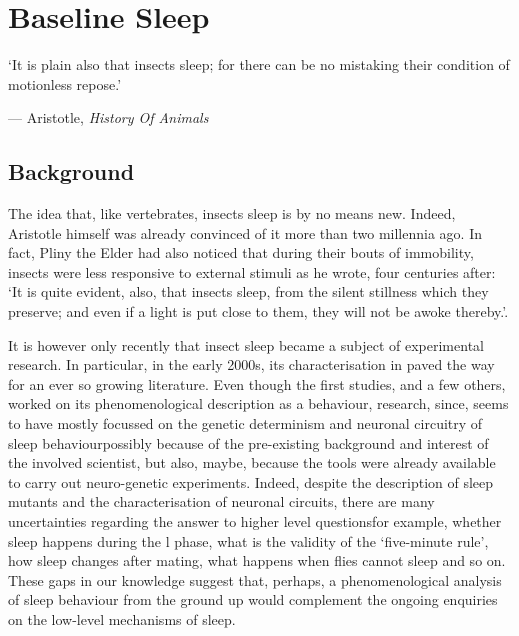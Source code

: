 \edef\figdir{\currfiledir/fig}

\chapter{Baseline Sleep} \label{baseline}

\epigraph{
	`It is plain also that insects sleep; for there can be no mistaking their condition of motionless repose.'}{--- Aristotle, \emph{History Of Animals}~\cite[book~IV, chap.~10]{aristotle_history_1965}}

\section{Background}


The idea that, like vertebrates, insects sleep is by no means new.
Indeed, Aristotle himself was already convinced of it more than two millennia ago. 
In fact, Pliny the Elder had also noticed that during their bouts of immobility, insects were less responsive to external stimuli as he wrote, four centuries after:
`It is quite evident, also, that insects sleep, from the silent stillness which they preserve; and even if a light is put close
to them, they will not be awoke thereby.'\cite[book~X, chap.~97]{pliny_the_elder_natural_1855}.

It is however only recently that insect sleep became a subject of experimental research. 
In particular, in the early 2000s, its characterisation in \droso{} paved the way for an ever so growing literature.
Even though the first studies, and a few others, worked on its phenomenological description as a behaviour, research, since, seems to have mostly focussed on the genetic determinism and neuronal circuitry of sleep behaviour\emd{}possibly because of the pre-existing background and interest of the involved scientist, but also, maybe, because the tools were already available to carry out neuro-genetic experiments.
Indeed, despite the description of sleep mutants and the characterisation of neuronal circuits, 
there are many uncertainties regarding the answer to higher level questions\emd{}for example, whether sleep happens during the \gls{l} phase, what is the validity of the `five-minute rule', how sleep changes after mating, what happens when flies cannot sleep and so on.
These gaps in our knowledge suggest that, perhaps,
a phenomenological analysis of sleep behaviour from the ground up would complement the ongoing enquiries on the low-level mechanisms of sleep.

